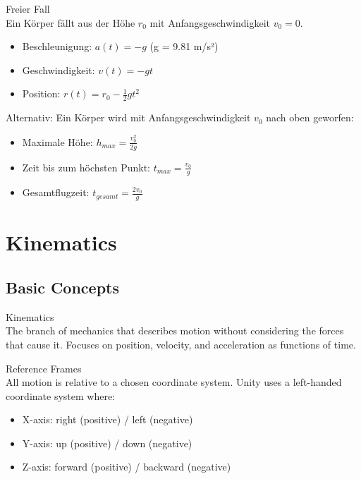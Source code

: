 \begin{example2}{Freier Fall}\\
    Ein Körper fällt aus der Höhe $r_0$ mit Anfangsgeschwindigkeit $v_0 = 0$.
    
    \begin{itemize}
        \item Beschleunigung: $a(t) = -g$ (g = 9.81 m/s²)
        \item Geschwindigkeit: $v(t) = -gt$
        \item Position: $r(t) = r_0 - \frac{1}{2}gt^2$
    \end{itemize}
    
    Alternativ: Ein Körper wird mit Anfangsgeschwindigkeit $v_0$ nach oben geworfen:
    \begin{itemize}
        \item Maximale Höhe: $h_{max} = \frac{v_0^2}{2g}$ 
        \item Zeit bis zum höchsten Punkt: $t_{max} = \frac{v_0}{g}$
        \item Gesamtflugzeit: $t_{gesamt} = \frac{2v_0}{g}$
    \end{itemize}
\end{example2}

\section{Kinematics}

\subsection{Basic Concepts}

\begin{definition}{Kinematics}\\
    The branch of mechanics that describes motion without considering the forces that cause it. Focuses on position, velocity, and acceleration as functions of time.
\end{definition}

\begin{concept}{Reference Frames}\\
    All motion is relative to a chosen coordinate system. Unity uses a left-handed coordinate system where:
    \begin{itemize}
        \item X-axis: right (positive) / left (negative)
        \item Y-axis: up (positive) / down (negative) 
        \item Z-axis: forward (positive) / backward (negative)
    \end{itemize}
\end{concept}

